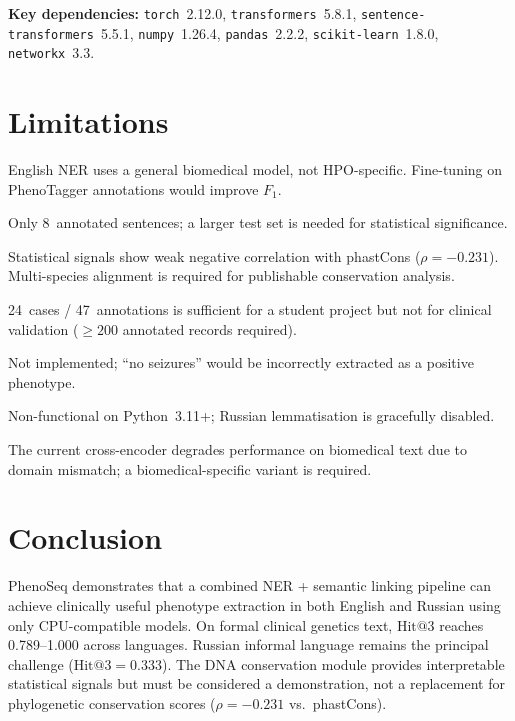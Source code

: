 \documentclass[11pt,a4paper]{article}
\begin{document}
\textbf{Key dependencies:} \texttt{torch}~2.12.0, \texttt{transformers}~5.8.1,
\texttt{sentence-transformers}~5.5.1, \texttt{numpy}~1.26.4,
\texttt{pandas}~2.2.2, \texttt{scikit-learn}~1.8.0, \texttt{networkx}~3.3.

\section{Limitations}

\begin{description}[nosep]
  \item[NER training.] English NER uses a general biomedical model, not
        HPO-specific.  Fine-tuning on PhenoTagger annotations would improve
        $F_1$.
  \item[Russian NER evaluation.] Only 8~annotated sentences; a larger test set
        is needed for statistical significance.
  \item[DNA conservation.] Statistical signals show weak negative correlation
        with phastCons ($\rho = -0.231$).  Multi-species alignment is required
        for publishable conservation analysis.
  \item[Test set size.] 24~cases / 47~annotations is sufficient for a student
        project but not for clinical validation ($\geq 200$ annotated records
        required).
  \item[Negation handling.] Not implemented; ``no seizures'' would be
        incorrectly extracted as a positive phenotype.
  \item[pymorphy2.] Non-functional on Python~3.11+; Russian lemmatisation is
        gracefully disabled.
  \item[Cross-encoder.] The current cross-encoder degrades performance on
        biomedical text due to domain mismatch; a biomedical-specific variant
        is required.
\end{description}

\section{Conclusion}

PhenoSeq demonstrates that a combined NER + semantic linking pipeline can
achieve clinically useful phenotype extraction in both English and Russian using
only CPU-compatible models.  On formal clinical genetics text, $\text{Hit@3}$
reaches 0.789--1.000 across languages.  Russian informal language remains the
principal challenge ($\text{Hit@3} = 0.333$).  The DNA conservation module
provides interpretable statistical signals but must be considered a
demonstration, not a replacement for phylogenetic conservation scores
($\rho = -0.231$ vs.\ phastCons).
\end{document}
